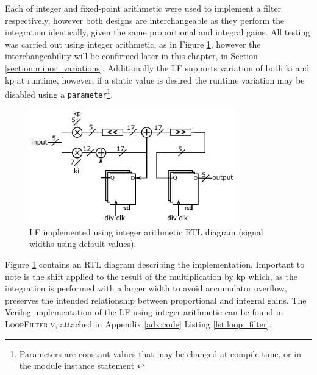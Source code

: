 Each of integer and fixed-point arithmetic were used to implement a filter respectively, however both designs are interchangeable as they perform the integration identically, given the same proportional and integral gains. All testing was carried out using integer arithmetic, as in Figure \ref{fig:integer_lf}, however the interchangeability will be confirmed later in this chapter, in Section \ref{section:minor_variations}. Additionally the \ac{LF} supports variation of both \acs{ki} and \acs{kp} at runtime, however, if a static value is desired the runtime variation may be disabled using a \texttt{parameter}\footnote{Parameters are constant values that may be changed at compile time, or in the module instance statement \cite{hdlworks2}}.
\begin{figure}[h]%
	\centering
	\includegraphics[width=0.8\textwidth]{../integer_lf} 
	\caption[\acl{LF} implemented using integer arithmetic \ac{RTL} diagram]{\acl{LF} implemented using integer arithmetic \ac{RTL} diagram (signal widths using default values).}
	\label{fig:integer_lf}
\end{figure}

Figure \ref{fig:integer_lf} contains an \ac{RTL} diagram describing the implementation. Important to note is the shift applied to the result of the multiplication by \acs{kp} which, as the integration is performed with a larger width to avoid accumulator overflow, preserves the intended relationship between proportional and integral gains.
The Verilog implementation of the \ac{LF} using integer arithmetic can be found in \textsc{LoopFilter.v}, attached in Appendix \ref{adx:code} Listing \ref{lst:loop_filter}.

